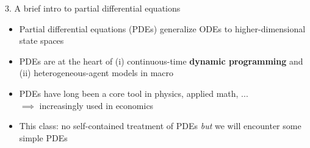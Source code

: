 \documentclass[10pt]{beamer}
\begin{document}
\begin{frame}{3. A brief intro to partial differential equations}
\begin{itemize}
\item Partial differential equations (PDEs) generalize ODEs to higher-dimensional state spaces

\item PDEs are at the heart of (i) continuous-time \textbf{dynamic programming} and (ii) heterogeneous-agent models in macro

\item PDEs have long been a core tool in physics, applied math, ... \\
$\implies$ increasingly used in economics

\item This class: no self-contained treatment of PDEs \textit{but} we will encounter some simple PDEs
\end{itemize}
\end{frame}
\end{document}
